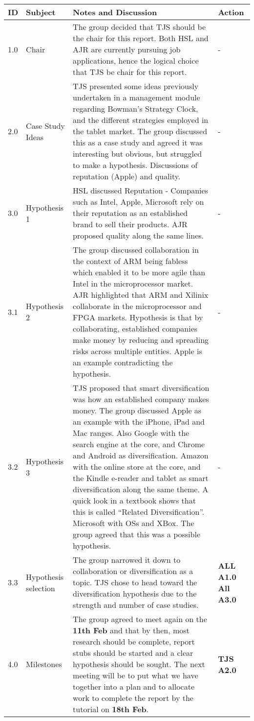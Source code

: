 \begin{center}
\begin{longtable}{| p{} |>{\raggedright\arraybackslash}p{} | p{} |>{\raggedright\arraybackslash}p{}|} \hline
\textbf{ID} & \textbf{Subject} & \textbf{Notes and Discussion} & \textbf{Action} \\ \hline
\endhead
1.0	&	Chair	&	The group decided that TJS should be the chair for this report. Both HSL and AJR are currently pursuing job applications, hence the logical choice that TJS be chair for this report. 	&   -	 \\ \hline
2.0	&	Case Study Ideas	&	TJS presented some ideas previously undertaken in a management module regarding Bowman's Strategy Clock, and the different strategies employed in the tablet market. The group discussed this as a case study and agreed it was interesting but obvious, but struggled to make a hypothesis. Discussions of reputation (Apple) and quality.	&-	 \\ \hline
3.0	&	Hypothesis 1	& HSL discussed Reputation - Companies such as Intel, Apple, Microsoft rely on their reputation as an established brand to sell their products. AJR proposed quality along the same lines.  & - \\ \hline
3.1	&	Hypothesis 2	& The group discussed collaboration in the context of ARM being fabless which enabled it to be more agile than Intel in the microprocessor market. AJR highlighted that ARM and Xilinix collaborate in the microprocessor and FPGA markets. Hypothesis is that by collaborating, established companies make money by reducing and spreading risks across multiple entities. Apple is an example contradicting the hypothesis. &	- \\ \hline
3.2	& Hypothesis 3 & TJS proposed that smart diversification was how an established company makes money. The group discussed Apple as an example with the iPhone, iPad and Mac ranges. Also Google with the search engine at the core, and Chrome and Android as diversification. Amazon with the online store at the core, and the Kindle e-reader and tablet as smart diversification along the same theme. A quick look in a textbook shows that this is called ``Related Diversification''. Microsoft with OSs and XBox. The group agreed that this was a possible hypothesis. &- \\ \hline
3.3 & Hypothesis selection & The group narrowed it down to collaboration or diversification as a topic. TJS chose to head toward the diversification hypothesis due to the strength and number of case studies. & \textbf{ALL A1.0} \textbf{All A3.0} \\ \hline
4.0 & Milestones & The group agreed to meet again on the \textbf{11th Feb} and that by then, most research should be complete, report stubs should be started and a clear hypothesis should be sought. The next meeting will be to put what we have together into a plan and to allocate work to complete the report by the tutorial on \textbf{18th Feb}. & \textbf{TJS A2.0} \\ \hline


\end{longtable}
\end{center}

